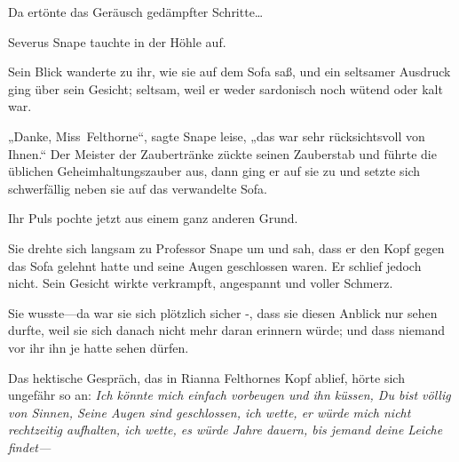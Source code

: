 Da ertönte das Geräusch gedämpfter Schritte…

Severus Snape tauchte in der Höhle auf.

Sein Blick wanderte zu ihr, wie sie auf dem Sofa saß, und ein seltsamer Ausdruck ging über sein Gesicht; seltsam, weil er weder sardonisch noch wütend oder kalt war.

„Danke, Miss~Felthorne“, sagte Snape leise, „das war sehr rücksichtsvoll von Ihnen.“ Der Meister der Zaubertränke zückte seinen Zauberstab und führte die üblichen Geheimhaltungszauber aus, dann ging er auf sie zu und setzte sich schwerfällig neben sie auf das verwandelte Sofa.

Ihr Puls pochte jetzt aus einem ganz anderen Grund.

Sie drehte sich langsam zu Professor Snape um und sah, dass er den Kopf gegen das Sofa gelehnt hatte und seine Augen geschlossen waren. Er schlief jedoch nicht. Sein Gesicht wirkte verkrampft, angespannt und voller Schmerz.

Sie wusste—da war sie sich plötzlich sicher -, dass sie diesen Anblick nur sehen durfte, weil sie sich danach nicht mehr daran erinnern würde; und dass niemand vor ihr ihn je hatte sehen dürfen.

Das hektische Gespräch, das in Rianna Felthornes Kopf ablief, hörte sich ungefähr so an: \emph{Ich könnte mich einfach vorbeugen und ihn küssen, Du bist völlig von Sinnen, Seine Augen sind geschlossen, ich wette, er würde mich nicht rechtzeitig aufhalten, ich wette, es würde Jahre dauern, bis jemand deine Leiche findet—}

